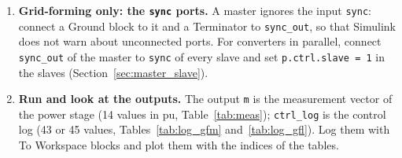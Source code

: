 \documentclass[11pt,a4paper]{scrartcl}
\newcommand{\code}[1]{\texttt{#1}}
\begin{document}
\begin{onehalfspace}
\begin{enumerate}[nosep]
\begin{center}
	\end{center}
	Type \code{p} in the mask, or the name of your own structure (the study models use \code{param.afe\_mod(1)} and \code{param.afe\_follower(1)}). For another converter, copy the example file next to your model, change the numbers and keep the field names.
	\item \textbf{Grid-forming only: the \code{sync} ports.} A master ignores the input \code{sync}: connect a Ground block to it and a Terminator to \code{sync\_out}, so that Simulink does not warn about unconnected ports. For converters in parallel, connect \code{sync\_out} of the master to \code{sync} of every slave and set \code{p.ctrl.slave = 1} in the slaves (Section~\ref{sec:master_slave}).
	\item \textbf{Run and look at the outputs.} The output \code{m} is the measurement vector of the power stage (14 values in pu, Table~\ref{tab:meas}); \code{ctrl\_log} is the control log (43 or 45 values, Tables~\ref{tab:log_gfm} and~\ref{tab:log_gfl}). Log them with To Workspace blocks and plot them with the indices of the tables.
\end{enumerate}


\end{onehalfspace}
\end{document}
